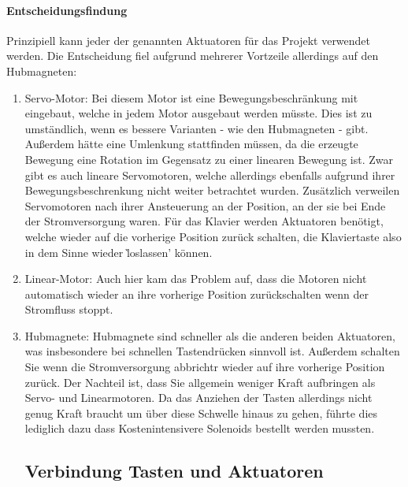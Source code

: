 \paragraph{Entscheidungsfindung}
Prinzipiell kann jeder der genannten Aktuatoren für das Projekt verwendet werden. Die Entscheidung fiel aufgrund
mehrerer Vortzeile allerdings auf den Hubmagneten:
\begin{enumerate}
	\item Servo-Motor: Bei diesem Motor ist eine Bewegungsbeschränkung mit eingebaut, welche in jedem Motor ausgebaut
	werden müsste. Dies ist zu umständlich, wenn es bessere Varianten - wie den Hubmagneten - gibt. Außerdem hätte
	eine Umlenkung stattfinden müssen, da die erzeugte Bewegung eine Rotation im Gegensatz zu einer linearen Bewegung
	ist. Zwar gibt es auch lineare Servomotoren, welche allerdings ebenfalls aufgrund ihrer Bewegungsbeschrenkung nicht
	weiter betrachtet wurden. Zusätzlich verweilen Servomotoren nach ihrer Ansteuerung an der Position, an der
	sie bei Ende der Stromversorgung waren. Für das Klavier werden Aktuatoren benötigt, welche wieder auf die vorherige
	Position zurück schalten, die Klaviertaste also in dem Sinne wieder \`loslassen' können.
	\item Linear-Motor: Auch hier kam das Problem auf, dass die Motoren nicht automatisch wieder an ihre vorherige
	Position zurückschalten wenn der Stromfluss stoppt.
	\item Hubmagnete: Hubmagnete sind schneller als die anderen beiden Aktuatoren, was insbesondere bei schnellen
	Tastendrücken sinnvoll ist. Außerdem schalten Sie wenn die Stromversorgung abbrichtr wieder auf ihre vorherige
	Position zurück. Der Nachteil ist, dass Sie allgemein weniger Kraft aufbringen als Servo- und Linearmotoren. Da
	das Anziehen der Tasten allerdings nicht genug Kraft braucht um über diese Schwelle hinaus zu gehen, führte dies
	lediglich dazu dass Kostenintensivere Solenoids bestellt werden mussten.


\subsection{Verbindung Tasten und Aktuatoren}


\end{enumerate}
